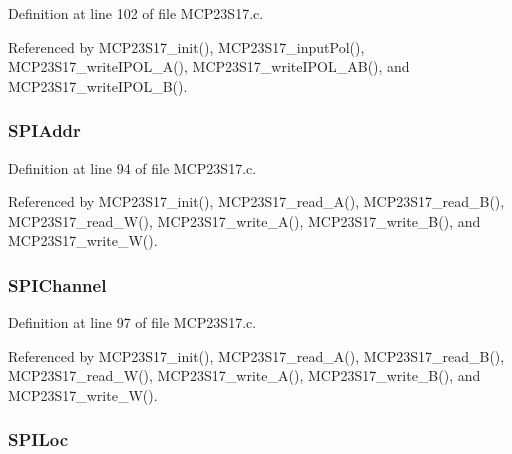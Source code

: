 Definition at line 102 of file M\-C\-P23\-S17.\-c.



Referenced by M\-C\-P23\-S17\-\_\-init(), M\-C\-P23\-S17\-\_\-input\-Pol(), M\-C\-P23\-S17\-\_\-write\-I\-P\-O\-L\-\_\-\-A(), M\-C\-P23\-S17\-\_\-write\-I\-P\-O\-L\-\_\-\-A\-B(), and M\-C\-P23\-S17\-\_\-write\-I\-P\-O\-L\-\_\-\-B().

\hypertarget{structtag_m_c_p23_s17_ae26e1445076496ae432b32c2eda2404b}{
\subsubsection[{S\-P\-I\-Addr}]{ S\-P\-I\-Addr}}\label{structtag_m_c_p23_s17_ae26e1445076496ae432b32c2eda2404b}


Definition at line 94 of file M\-C\-P23\-S17.\-c.



Referenced by M\-C\-P23\-S17\-\_\-init(), M\-C\-P23\-S17\-\_\-read\-\_\-\-A(), M\-C\-P23\-S17\-\_\-read\-\_\-\-B(), M\-C\-P23\-S17\-\_\-read\-\_\-\-W(), M\-C\-P23\-S17\-\_\-write\-\_\-\-A(), M\-C\-P23\-S17\-\_\-write\-\_\-\-B(), and M\-C\-P23\-S17\-\_\-write\-\_\-\-W().

\hypertarget{structtag_m_c_p23_s17_a4378f10441758912284a247d7863f13b}{
\subsubsection[{S\-P\-I\-Channel}]{ S\-P\-I\-Channel}}\label{structtag_m_c_p23_s17_a4378f10441758912284a247d7863f13b}


Definition at line 97 of file M\-C\-P23\-S17.\-c.



Referenced by M\-C\-P23\-S17\-\_\-init(), M\-C\-P23\-S17\-\_\-read\-\_\-\-A(), M\-C\-P23\-S17\-\_\-read\-\_\-\-B(), M\-C\-P23\-S17\-\_\-read\-\_\-\-W(), M\-C\-P23\-S17\-\_\-write\-\_\-\-A(), M\-C\-P23\-S17\-\_\-write\-\_\-\-B(), and M\-C\-P23\-S17\-\_\-write\-\_\-\-W().

\hypertarget{structtag_m_c_p23_s17_a9ccb6d79347bd833db5585b354af952f}{
\subsubsection[{S\-P\-I\-Loc}]{ S\-P\-I\-Loc}}\label{structtag_m_c_p23_s17_a9ccb6d79347bd833db5585b354af952f}


